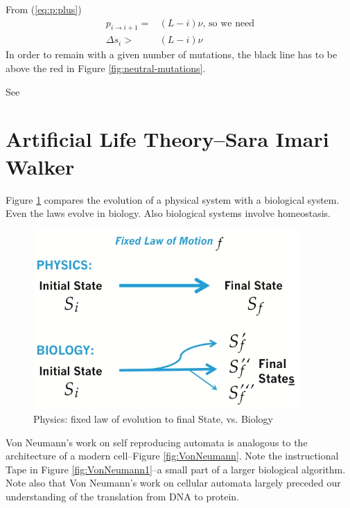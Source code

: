\documentclass[]{article}
\begin{document}
From (\ref{eq:p:plus})
\begin{align*}
	p_{i\rightarrow i+1} =& (L-i)\nu \text{, so we need}\\
	\Delta s_i > & (L-i)\nu
\end{align*}
In order to remain with a given number of mutations, the black line has to be above the red in Figure \ref{fig:neutral-mutations}.

See \cite{eigen1978hypercycle,eigen1988molecular,eigen2002error,crotty2001rna,stadtler2002fitness_landscapes,wessner2010origins}


\section[Artificial Life Theory]{Artificial Life Theory--Sara Imari Walker}


Figure \ref{fig:PhysicsvsBiology} compares the evolution of a physical system with a biological system. Even the laws evolve in biology. Also biological systems involve homeostasis.
\begin{figure}[H]
	\caption{Physics: fixed law of evolution to final State, vs. Biology}\label{fig:PhysicsvsBiology}
	\includegraphics[width=0.9\textwidth]{PhysicsvsBiology}
\end{figure}

Von Neumann's work on self reproducing automata \cite{neumann1966theory}  \cite{neumann1958computer} is analogous to  the architecture of a modern cell--Figure \ref{fig:VonNeumann}. Note the instructional Tape in Figure  \ref{fig:VonNeumann1}--a small part of a larger biological algorithm. Note also that Von Neumann's work on cellular automata largely preceded our understanding of the translation from DNA to protein.
\end{document}
